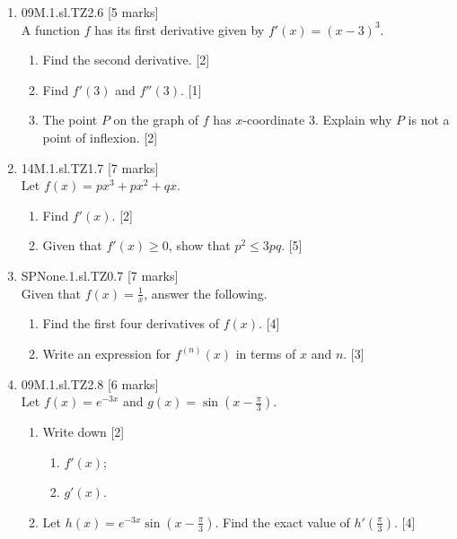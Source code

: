 \documentclass[12pt, twoside]{article}
\begin{document}
\begin{enumerate}
  \item 09M.1.sl.TZ2.6 \hfill [5 marks]\\
  A function $f$ has its first derivative given by $f'(x)=(x-3)^3$.
  \begin{enumerate}
    \item Find the second derivative. \hfill [2]
    \item Find $f'(3)$ and $f''(3)$. \hfill [1]
    \item The point $P$ on the graph of $f$ has $x$-coordinate 3. Explain why $P$ is not a point of inflexion. \hfill [2]
  \end{enumerate}

  \item 14M.1.sl.TZ1.7 \hfill [7 marks]\\
  Let $f(x)= px^3 + px^2 + qx$.
  \begin{enumerate}
    \item Find $f'(x)$. \hfill [2]
    \item Given that $f'(x) \geq 0$, show that $p^2 \leq 3pq$. \hfill [5]
  \end{enumerate}


  \item SPNone.1.sl.TZ0.7 \hfill [7 marks]\\
  Given that $f(x)= \frac{1}{x}$, answer the following.
  \begin{enumerate}
    \item Find the first four derivatives of $f(x)$. \hfill [4]
    \item Write an expression for $f^{(n)}(x)$ in terms of $x$ and $n$. \hfill [3]
  \end{enumerate}


  \item 09M.1.sl.TZ2.8 \hfill [6 marks]\\
  Let $f(x)=e^{-3x}$ and $g(x)= \sin(x- \frac{\pi}{3})$.
  \begin{enumerate}
    \item Write down \hfill [2]
    \begin{enumerate}
      \item $f'(x)$;
      \item $g'(x)$.
    \end{enumerate}
    \item Let $h(x)=e^{-3x} \sin(x- \frac{\pi}{3})$. Find the exact value of $h'(\frac{\pi}{3})$. \hfill [4]
  \end{enumerate}





\end{enumerate}
\end{document}
